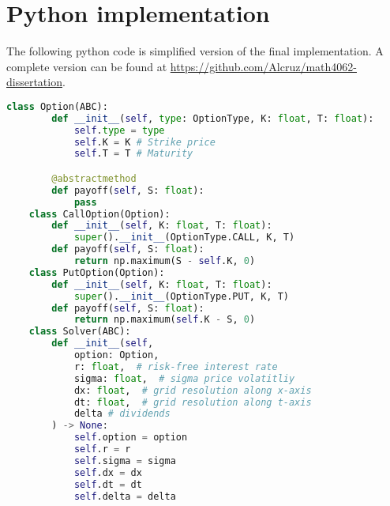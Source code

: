 \section{Python implementation}
The following python code is simplified version of the final implementation. A complete version can be found at \url{https://github.com/Alcruz/math4062-dissertation}.

\begin{lstlisting}[language=Python, caption=Base classses for options solver.]
    class Option(ABC):
        def __init__(self, type: OptionType, K: float, T: float):
            self.type = type
            self.K = K # Strike price
            self.T = T # Maturity

        @abstractmethod
        def payoff(self, S: float):
            pass
    class CallOption(Option):
        def __init__(self, K: float, T: float):
            super().__init__(OptionType.CALL, K, T)
        def payoff(self, S: float):
            return np.maximum(S - self.K, 0) 
    class PutOption(Option):
        def __init__(self, K: float, T: float):
            super().__init__(OptionType.PUT, K, T)
        def payoff(self, S: float):
            return np.maximum(self.K - S, 0)
    class Solver(ABC): 
        def __init__(self, 
            option: Option,
            r: float,  # risk-free interest rate
            sigma: float,  # sigma price volatitliy
            dx: float,  # grid resolution along x-axis
            dt: float,  # grid resolution along t-axis
            delta # dividends
        ) -> None:
            self.option = option
            self.r = r
            self.sigma = sigma
            self.dx = dx
            self.dt = dt
            self.delta = delta
\end{lstlisting}
